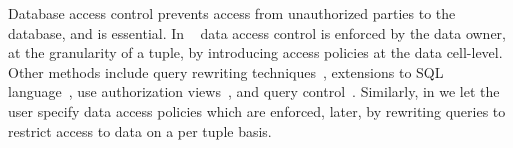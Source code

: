 Database access control prevents access from unauthorized parties to the database, and is essential. 
In ~\cite{hippocratic-dbs,disclo-hippocratic-dbs} data access control is enforced by the data owner, at the granularity of a tuple, by introducing access policies at the data cell-level. Other methods include
query rewriting techniques~\cite{ans-query-views, motro-access-auth}, extensions to SQL language~\cite{chaudhari-auth-predic-grant}, use authorization views~\cite{rizvi-query-rewrite-access-control}, and query control~\cite{shay-acess-control-query-control}. Similarly, %
in \project{} we let the user specify data access policies which are enforced, later, by rewriting queries to restrict access to data on a per tuple basis.

